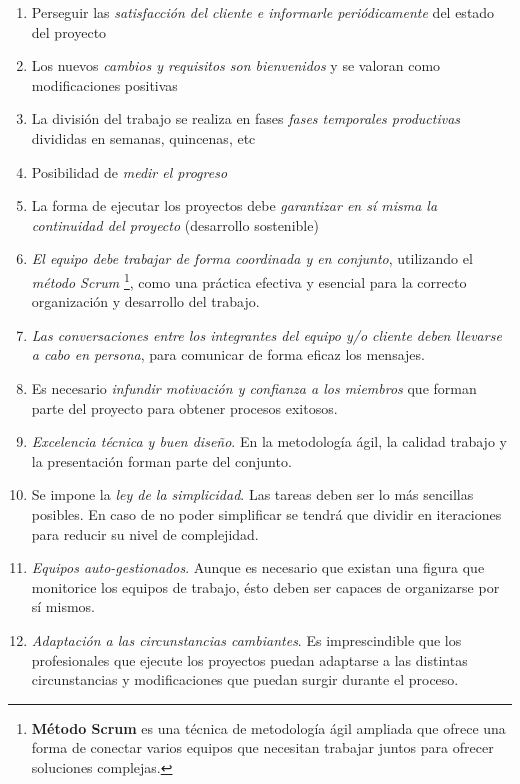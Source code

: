 \documentclass[12pt]{article}
\begin{document}
\begin{enumerate}
  \item Perseguir las \textit{satisfacción del cliente e informarle periódicamente} del estado del proyecto
  \item Los nuevos \textit{cambios y requisitos son bienvenidos} y se valoran como modificaciones positivas
  \item La división del trabajo se realiza en fases \textit{fases temporales productivas} divididas en semanas, quincenas, etc
  \item Posibilidad de \textit{medir el progreso}
  \item La forma de ejecutar los proyectos debe \textit{garantizar en sí misma la continuidad del proyecto} (desarrollo sostenible)
  \item \textit{El equipo debe trabajar de forma coordinada y en conjunto}, utilizando el \textit{método Scrum} \footnote{\textbf{Método Scrum} es una técnica de metodología ágil ampliada que ofrece una forma de conectar varios equipos que necesitan trabajar juntos para ofrecer soluciones complejas.}, como una práctica efectiva y esencial para la correcto organización y desarrollo del trabajo.
  \item \textit{Las conversaciones entre los integrantes del equipo y/o cliente deben llevarse a cabo en persona}, para comunicar de forma eficaz los mensajes.
  \item Es necesario \textit{infundir motivación y confianza a los miembros} que forman parte del proyecto para obtener procesos exitosos.
  \item \textit{Excelencia técnica y buen diseño}. En la metodología ágil, la calidad trabajo y la presentación forman parte del conjunto.
  \item Se impone la \textit{ley de la simplicidad}. Las tareas deben ser lo más sencillas posibles. En caso de no poder simplificar se tendrá que dividir en iteraciones para reducir su nivel de complejidad.
  \item \textit{Equipos auto-gestionados}. Aunque es necesario que existan una figura que monitorice los equipos de trabajo, ésto deben ser capaces de organizarse por sí mismos.
  \item \textit{Adaptación a las circunstancias cambiantes}. Es imprescindible que los profesionales que ejecute los proyectos puedan adaptarse a las distintas circunstancias y modificaciones que puedan surgir durante el proceso.

\end{enumerate}
\end{document}
